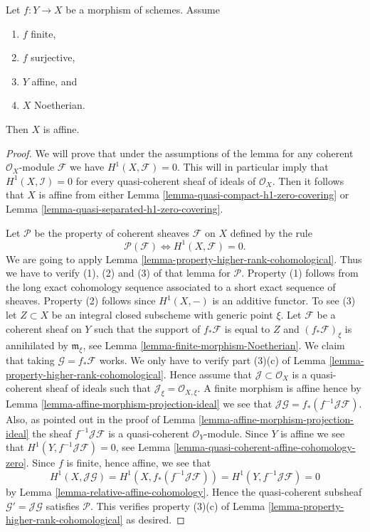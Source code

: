 \begin{lemma}
\label{lemma-image-affine-finite-morphism-affine-Noetherian}
Let $f : Y \to X$ be a morphism of schemes.
Assume
\begin{enumerate}
\item $f$ finite,
\item $f$ surjective,
\item $Y$ affine, and
\item $X$ Noetherian.
\end{enumerate}
Then $X$ is affine.
\end{lemma}

\begin{proof}
We will prove that under the assumptions of the lemma for any coherent
$\mathcal{O}_X$-module $\mathcal{F}$ we have $H^1(X, \mathcal{F}) = 0$.
This will in particular imply that $H^1(X, \mathcal{I}) = 0$
for every quasi-coherent sheaf of ideals of $\mathcal{O}_X$. Then it
follows that $X$ is affine from either
Lemma \ref{lemma-quasi-compact-h1-zero-covering} or
Lemma \ref{lemma-quasi-separated-h1-zero-covering}.

\medskip\noindent
Let $\mathcal{P}$ be the property of coherent sheaves
$\mathcal{F}$ on $X$ defined by the rule
$$
\mathcal{P}(\mathcal{F}) \Leftrightarrow H^1(X, \mathcal{F}) = 0.
$$
We are going to apply Lemma \ref{lemma-property-higher-rank-cohomological}.
Thus we have to verify (1), (2) and (3) of that lemma for $\mathcal{P}$.
Property (1) follows from the long exact cohomology sequence associated
to a short exact sequence of sheaves. Property (2) follows since
$H^1(X, -)$ is an additive functor. To see (3) let $Z \subset X$ be
an integral closed subscheme with generic point $\xi$.
Let $\mathcal{F}$ be a coherent sheaf on $Y$ such that
the support of $f_*\mathcal{F}$ is equal to $Z$
and $(f_*\mathcal{F})_\xi$ is annihilated by $\mathfrak m_\xi$,
see Lemma \ref{lemma-finite-morphism-Noetherian}. We claim that
taking $\mathcal{G} = f_*\mathcal{F}$ works. We only have to verify
part (3)(c) of Lemma \ref{lemma-property-higher-rank-cohomological}.
Hence assume that $\mathcal{J} \subset \mathcal{O}_X$ is a
quasi-coherent sheaf of ideals such that
$\mathcal{J}_\xi = \mathcal{O}_{X, \xi}$.
A finite morphism is affine hence by
Lemma \ref{lemma-affine-morphism-projection-ideal} we see that
$\mathcal{J}\mathcal{G} = f_*(f^{-1}\mathcal{J}\mathcal{F})$.
Also, as pointed out in the proof of
Lemma \ref{lemma-affine-morphism-projection-ideal} the sheaf
$f^{-1}\mathcal{J}\mathcal{F}$ is a quasi-coherent $\mathcal{O}_Y$-module.
Since $Y$ is affine we see that $H^1(Y, f^{-1}\mathcal{J}\mathcal{F}) = 0$,
see Lemma \ref{lemma-quasi-coherent-affine-cohomology-zero}.
Since $f$ is finite, hence affine, we see that
$$
H^1(X, \mathcal{J}\mathcal{G}) =
H^1(X, f_*(f^{-1}\mathcal{J}\mathcal{F})) =
H^1(Y, f^{-1}\mathcal{J}\mathcal{F}) = 0
$$
by Lemma \ref{lemma-relative-affine-cohomology}.
Hence the quasi-coherent subsheaf $\mathcal{G}' = \mathcal{J}\mathcal{G}$
satisfies $\mathcal{P}$. This verifies property (3)(c) of
Lemma \ref{lemma-property-higher-rank-cohomological} as desired.
\end{proof}